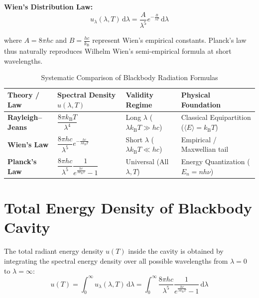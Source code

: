 \documentclass[11pt,a4paper]{article}
\newcommand{\diff}{\mathrm{d}}
\newcommand{\kB}{k_{\mathrm{B}}}
\newcommand{\avgE}{\langle E \rangle}
\begin{document}
\begin{resultbox}
\textbf{Wien's Distribution Law:}
\begin{equation}
    \boxed{u_\lambda(\lambda, T)\,\diff\lambda = \frac{A}{\lambda^5} e^{-\frac{B}{\lambda T}} \,\diff\lambda} \tag{VIII}
\end{equation}
\end{resultbox}
where $A = 8\pi hc$ and $B = \frac{hc}{\kB}$ represent Wien's empirical constants. Planck's law thus naturally reproduces Wilhelm Wien's semi-empirical formula at short wavelengths.

\begin{table}[H]
\centering
\footnotesize
\caption{Systematic Comparison of Blackbody Radiation Formulas}
\label{tab:comparison}
\vspace{0.3em}
\begin{tabular}{llll}
\toprule
\textbf{Theory / Law} & \textbf{Spectral Density $u(\lambda, T)$} & \textbf{Validity Regime} & \textbf{Physical Foundation} \\ \midrule
\textbf{Rayleigh--Jeans} & $\dfrac{8\pi \kB T}{\lambda^4}$ & Long $\lambda$ ($\lambda \kB T \gg hc$) & Classical Equipartition ($\avgE = \kB T$) \\[0.6em]
\textbf{Wien's Law}      & $\dfrac{8\pi hc}{\lambda^5} e^{-\frac{hc}{\lambda \kB T}}$ & Short $\lambda$ ($\lambda \kB T \ll hc$) & Empirical / Maxwellian tail \\[0.6em]
\textbf{Planck's Law}    & $\dfrac{8\pi hc}{\lambda^5} \dfrac{1}{e^{\frac{hc}{\lambda \kB T}} - 1}$ & Universal (All $\lambda, T$) & Energy Quantization ($E_n = nh\nu$) \\ \bottomrule
\end{tabular}
\end{table}

\section{Total Energy Density of Blackbody Cavity}

The total radiant energy density $u(T)$ inside the cavity is obtained by integrating the spectral energy density over all possible wavelengths from $\lambda = 0$ to $\lambda = \infty$:
\begin{equation}
    u(T) = \int_{0}^{\infty} u_\lambda(\lambda, T) \,\diff\lambda = \int_{0}^{\infty} \frac{8\pi hc}{\lambda^5} \frac{1}{e^{\frac{hc}{\lambda \kB T}} - 1} \,\diff\lambda
\end{equation}
\end{document}
